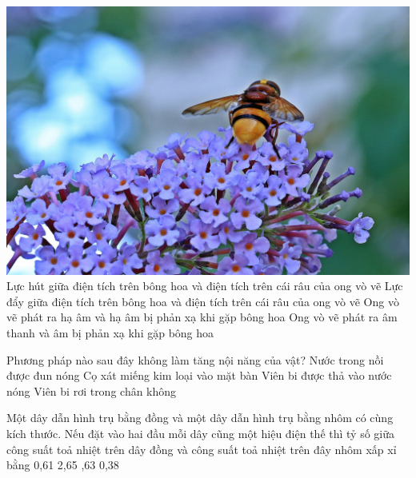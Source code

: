 \begin{ex}
	{\includegraphics[scale=0.08]{../figs/FINAL-SEM1-005-7}}
	\choice
	{Lực hút giữa điện tích trên bông hoa và điện tích trên cái râu của ong vò vẽ}
	{\True Lực đẩy giữa điện tích trên bông hoa và điện tích trên cái râu của ong vò vẽ}
	{Ong vò vẽ phát ra hạ âm và hạ âm bị phản xạ khi gặp bông hoa}
	{Ong vò vẽ phát ra âm thanh và âm bị phản xạ khi gặp bông hoa}
	\loigiai{}
\end{ex}
\begin{ex}
	Phương pháp nào sau đây không làm tăng nội năng của vật?
	\choice
	{Nước trong nồi được đun nóng}
	{Cọ xát miếng kim loại vào mặt bàn}
	{Viên bi được thả vào nước nóng}
	{\True Viên bi rơi trong chân không}
	\loigiai{}
\end{ex}
\begin{ex}
	 Một dây dẫn hình trụ bằng đồng và một dây dẫn hình trụ bằng nhôm có cùng kích thước. Nếu đặt vào hai đầu mỗi dây cũng một hiệu điện thế thì tỷ số giữa công suất toả nhiệt trên dây đồng và công suất toả nhiệt trên đây nhôm xấp xỉ bằng
	\choice
	{0,61}
	{2,65}
	{,63}
	{0,38}
\end{ex}
